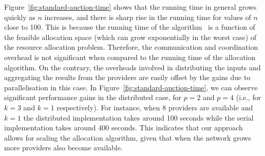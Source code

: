 Figure~\ref{fig:standard-auction-time} shows that the running time in general grows quickly as $n$ increases, and there is sharp rise in the running time for values of $n$ close to 100.
This is because the running time of the algorithm~\cite{Zhang2015Truthful} is 
a function of the feasible allocation space (which can grow exponentially in the worst case) of the resource allocation problem.
Therefore, the communication and coordination overhead is not significant when compared to the running time of the allocation algorithm. 
On the contrary, the overheads involved in distributing the inputs and aggregating the results from the providers are easily offset by the gains due to parallelisation in this case. 
In Figure~\ref{fig:standard-auction-time},  we can observe significant performance 
gains in the distributed case, for $p=2$ and $p=4$ (i.e., for $k=3$ and $k=1$ respectively). 
For instance, when 8 providers are available and $k=1$ the distributed implementation
takes around 100 seconds while the serial implementation takes around 400 seconds. 
This indicates that our approach allows for scaling the allocation algorithm, 
given that when the network grows more providers also become available.

